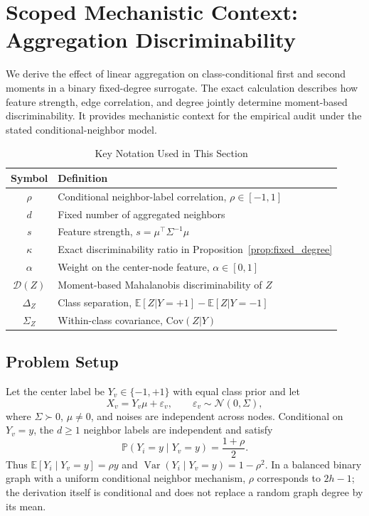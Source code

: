 
\section{Scoped Mechanistic Context: Aggregation Discriminability}
\label{sec:snr}

We derive the effect of linear aggregation on class-conditional first and second moments in a binary fixed-degree surrogate. The exact calculation describes how feature strength, edge correlation, and degree jointly determine moment-based discriminability. It provides mechanistic context for the empirical audit under the stated conditional-neighbor model.

\begin{table}[t]
\centering
\caption{Key Notation Used in This Section}
\label{tab:notation}
\small
\begin{tabular}{@{}cl@{}}
\toprule
\textbf{Symbol} & \textbf{Definition} \\
\midrule
$\rho$ & Conditional neighbor-label correlation, $\rho\in[-1,1]$ \\
$d$ & Fixed number of aggregated neighbors \\
$s$ & Feature strength, $s=\mu^\top\Sigma^{-1}\mu$ \\
$\kappa$ & Exact discriminability ratio in Proposition~\ref{prop:fixed_degree} \\
$\alpha$ & Weight on the center-node feature, $\alpha\in[0,1]$ \\
$\mathcal{D}(Z)$ & Moment-based Mahalanobis discriminability of $Z$ \\
$\Delta_Z$ & Class separation, $\mathbb{E}[Z|Y=+1] - \mathbb{E}[Z|Y=-1]$ \\
$\Sigma_Z$ & Within-class covariance, $\mathrm{Cov}(Z|Y)$ \\
\bottomrule
\end{tabular}
\end{table}

\subsection{Problem Setup}

Let the center label be $Y_v\in\{-1,+1\}$ with equal class prior and let
\begin{equation}
    X_v=Y_v\mu+\varepsilon_v,
    \qquad \varepsilon_v\sim\mathcal{N}(0,\Sigma),
\end{equation}
where $\Sigma\succ0$, $\mu\neq0$, and noises are independent across nodes. Conditional on $Y_v=y$, the $d\geq1$ neighbor labels are independent and satisfy
\begin{equation}
    \mathbb{P}(Y_i=y\mid Y_v=y)=\frac{1+\rho}{2}.
\end{equation}
Thus $\mathbb{E}[Y_i\mid Y_v=y]=\rho y$ and $\operatorname{Var}(Y_i\mid Y_v=y)=1-\rho^2$. In a balanced binary graph with a uniform conditional neighbor mechanism, $\rho$ corresponds to $2h-1$; the derivation itself is conditional and does not replace a random graph degree by its mean.

